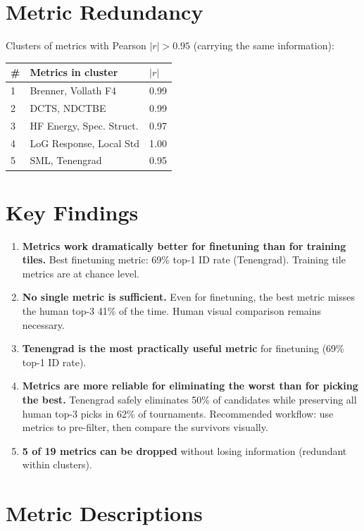\documentclass[11pt]{article}
\begin{document}
\section{Metric Redundancy}

Clusters of metrics with Pearson $|r| > 0.95$ (carrying the same information):
\vspace{0.5em}
\begin{center}
\small
\begin{tabular}{lll}
\toprule
\textbf{\#} & \textbf{Metrics in cluster} & \textbf{$|r|$} \\
\midrule
1 & Brenner, Vollath F4 & 0.99 \\
2 & DCTS, NDCTBE & 0.99 \\
3 & HF Energy, Spec. Struct. & 0.97 \\
4 & LoG Response, Local Std & 1.00 \\
5 & SML, Tenengrad & 0.95 \\
\bottomrule
\end{tabular}
\end{center}

\section{Key Findings}
\begin{enumerate}
\item \textbf{Metrics work dramatically better for finetuning than for training tiles.} Best finetuning metric: 69\% top-1 ID rate (Tenengrad). Training tile metrics are at chance level.
\item \textbf{No single metric is sufficient.} Even for finetuning, the best metric misses the human top-3 41\% of the time. Human visual comparison remains necessary.
\item \textbf{Tenengrad is the most practically useful metric} for finetuning (69\% top-1 ID rate).
\item \textbf{Metrics are more reliable for eliminating the worst than for picking the best.} Tenengrad safely eliminates 50\% of candidates while preserving all human top-3 picks in 62\% of tournaments. Recommended workflow: use metrics to pre-filter, then compare the survivors visually.
\item \textbf{5 of 19 metrics can be dropped} without losing information (redundant within clusters).
\end{enumerate}

\appendix
\section{Metric Descriptions}
\small
\end{document}
